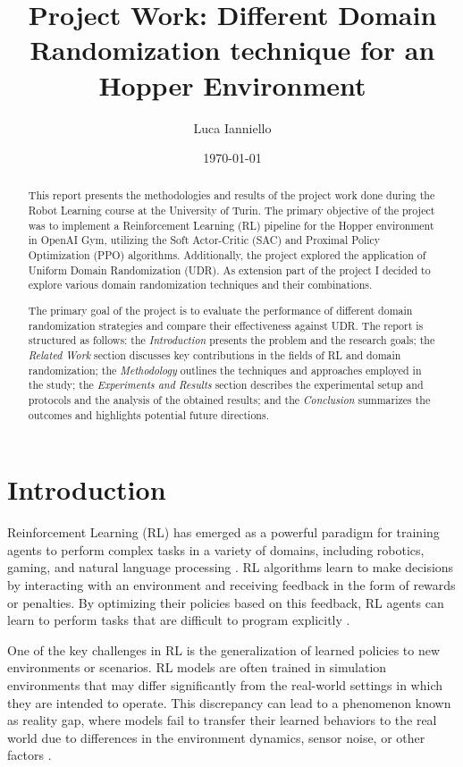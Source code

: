 \documentclass[11pt]{article}
\title{Project Work: Different Domain Randomization technique for an Hopper Environment}
\author{Luca Ianniello}
\date{\today}
\begin{document}
\maketitle

\begin{abstract}

    This report presents the methodologies and results of the project work done during the Robot Learning course at the University of Turin. The primary objective of the project was to implement a Reinforcement Learning (RL) pipeline for the Hopper environment in OpenAI Gym, utilizing the Soft Actor-Critic (SAC) and Proximal Policy Optimization (PPO) algorithms. Additionally, the project explored the application of Uniform Domain Randomization (UDR). As extension part of the project I decided to explore various domain randomization techniques and their combinations.

    The primary goal of the project is to evaluate the performance of different domain randomization strategies and compare their effectiveness against UDR. The report is structured as follows: the \textit{Introduction} presents the problem and the research goals; the \textit{Related Work} section discusses key contributions in the fields of RL and domain randomization; the \textit{Methodology} outlines the techniques and approaches employed in the study; the \textit{Experiments and Results} section describes the experimental setup and protocols and the analysis of the obtained results; and the \textit{Conclusion} summarizes the outcomes and highlights potential future directions.
    
\end{abstract}

\section{Introduction}

Reinforcement Learning (RL) has emerged as a powerful paradigm for training agents to perform complex tasks in a variety of domains, including robotics, gaming, and natural language processing \cite{Sutton2018}. RL algorithms learn to make decisions by interacting with an environment and receiving feedback in the form of rewards or penalties. By optimizing their policies based on this feedback, RL agents can learn to perform tasks that are difficult to program explicitly \cite{Kober2013}. 

One of the key challenges in RL is the generalization of learned policies to new environments or scenarios. RL models are often trained in simulation environments that may differ significantly from the real-world settings in which they are intended to operate. This discrepancy can lead to a phenomenon known as reality gap, where models fail to transfer their learned behaviors to the real world due to differences in the environment dynamics, sensor noise, or other factors \cite{Kormushev2013, Hofer2020}.
\end{document}
